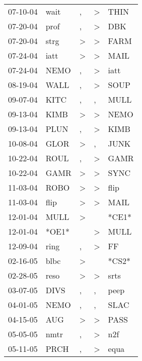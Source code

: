 \begin{supertabular}{lllll}
 07-10-04 &   wait &                , &     \textgreater &   THIN \\
 07-20-04 &   prof &                , &     \textgreater &    DBK \\
 07-20-04 &   strg &     \textgreater &     \textgreater &   FARM \\
 07-24-04 &   iatt &     \textgreater &     \textgreater &   MAIL \\
 07-24-04 &   NEMO &                , &     \textgreater &   iatt \\
 08-19-04 &   WALL &                , &     \textgreater &   SOUP \\
 09-07-04 &   KITC &                , &                , &   MULL \\
 09-13-04 &   KIMB &     \textgreater &     \textgreater &   NEMO \\
 09-13-04 &   PLUN &                , &     \textgreater &   KIMB \\
 10-08-04 &   GLOR &     \textgreater &                , &   JUNK \\
 10-22-04 &   ROUL &                , &     \textgreater &   GAMR \\
 10-22-04 &   GAMR &     \textgreater &     \textgreater &   SYNC \\
 11-03-04 &   ROBO &     \textgreater &     \textgreater &   flip \\
 11-03-04 &   flip &     \textgreater &     \textgreater &   MAIL \\
 12-01-04 &   MULL &     \textgreater &                  &  *CE1* \\
 12-01-04 &  *OE1* &                  &     \textgreater &   MULL \\
 12-09-04 &   ring &                , &     \textgreater &     FF \\
 02-16-05 &   blbc &     \textgreater &                  &  *CS2* \\
 02-28-05 &   reso &     \textgreater &     \textgreater &   srts \\
 03-07-05 &   DIVS &                , &                , &   peep \\
 04-01-05 &   NEMO &                , &                , &   SLAC \\
 04-15-05 &    AUG &     \textgreater &     \textgreater &   PASS \\
 05-05-05 &   nmtr &                , &     \textgreater &    n2f \\
 05-11-05 &   PRCH &                , &     \textgreater &   equa \\

\end{supertabular}
